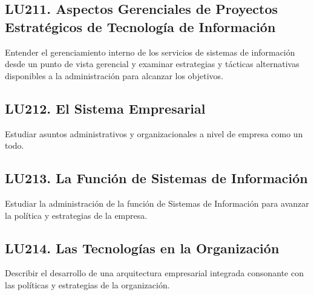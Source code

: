 \subsection{LU211. Aspectos Gerenciales de Proyectos Estratégicos de Tecnología de Información}\label{sec:BOK-LU211}\label{sec:LU211}
\begin{LearningUnit}
\begin{LUGoal}
\item Entender el gerenciamiento interno de los servicios de sistemas de información desde un punto de vista gerencial y examinar estrategias y tácticas alternativas disponibles a la administración para alcanzar los objetivos.
\end{LUGoal}

\end{LearningUnit}

\subsection{LU212. El Sistema Empresarial}\label{sec:BOK-LU212}\label{sec:LU212}
\begin{LearningUnit}
\begin{LUGoal}
\item Estudiar asuntos administrativos y organizacionales a nivel de empresa como un todo.
\end{LUGoal}

\end{LearningUnit}

\subsection{LU213. La Función de Sistemas de Información}\label{sec:BOK-LU213}\label{sec:LU213}
\begin{LearningUnit}
\begin{LUGoal}
\item Estudiar la administración de la función de Sistemas de Información para avanzar la política y estrategias de la empresa.
\end{LUGoal}

\end{LearningUnit}

\subsection{LU214. Las Tecnologías en la Organización}\label{sec:BOK-LU214}\label{sec:LU214}
\begin{LearningUnit}
\begin{LUGoal}
\item Describir el desarrollo de una arquitectura empresarial integrada consonante con las políticas y estrategias de la organización.
\end{LUGoal}

\end{LearningUnit}

